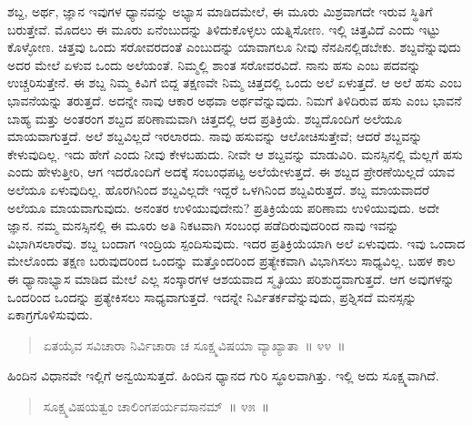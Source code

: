 ಶಬ್ದ, ಅರ್ಥ, ಜ್ಞಾನ ಇವುಗಳ ಧ್ಯಾನವನ್ನು ಅಭ್ಯಾಸ ಮಾಡಿದಮೇಲೆ, ಈ ಮೂರು ಮಿಶ್ರವಾಗದೇ ಇರುವ ಸ್ಥಿತಿಗೆ ಬರುತ್ತೇವೆ. ಮೊದಲು ಈ ಮೂರು ಏನೆಂಬುದನ್ನು ತಿಳಿದುಕೊಳ್ಳಲು ಯತ್ನಿಸೋಣ. ಇಲ್ಲಿ ಚಿತ್ತವಿದೆ ಎಂದು ಇಟ್ಟು ಕೊಳ್ಳೋಣ. ಚಿತ್ತವು ಒಂದು ಸರೋವರದಂತೆ ಎಂಬುದನ್ನು ಯಾವಾಗಲೂ ನೀವು ನೆನಪಿನಲ್ಲಿಡಬೇಕು. ಶಬ್ದವೆನ್ನುವುದು ಅದರ ಮೇಲೆ ಏಳುವ ಒಂದು ಅಲೆಯಂತೆ. ನಿಮ್ಮಲ್ಲಿ ಶಾಂತ ಸರೋವರವಿದೆ. ನಾನು ಹಸು ಎಂಬ ಪದವನ್ನು ಉಚ್ಚರಿಸುತ್ತೇನೆ. ಈ ಶಬ್ದ ನಿಮ್ಮ ಕಿವಿಗೆ ಬಿದ್ದ ತಕ್ಷಣವೇ ನಿಮ್ಮ ಚಿತ್ತದಲ್ಲಿ ಒಂದು ಅಲೆ ಏಳುತ್ತದೆ. ಆ ಅಲೆ ಹಸು ಎಂಬ ಭಾವನೆಯನ್ನು ತರುತ್ತದೆ. ಅದನ್ನೇ ನಾವು ಆಕಾರ ಅಥವಾ ಅರ್ಥವೆನ್ನುವುದು. ನಿಮಗೆ ತಿಳಿದಿರುವ ಹಸು ಎಂಬ ಭಾವನೆ ಬಾಹ್ಯ ಮತ್ತು ಅಂತರಂಗ ಶಬ್ದದ ಪರಿಣಾಮವಾಗಿ ಚಿತ್ತದಲ್ಲಿ ಆದ ಪ್ರತಿಕ್ರಿಯೆ. ಶಬ್ದದೊಂದಿಗೆ ಅಲೆಯೂ ಮಾಯವಾಗುತ್ತದೆ. ಅಲೆ ಶಬ್ದವಿಲ್ಲದೆ ಇರಲಾರದು. ನಾವು ಹಸುವನ್ನು ಆಲೋಚಿಸುತ್ತೇವೆ; ಆದರೆ ಶಬ್ದವನ್ನು ಕೇಳುವುದಿಲ್ಲ. ಇದು ಹೇಗೆ ಎಂದು ನೀವು ಕೇಳಬಹುದು. ನೀವೇ ಆ ಶಬ್ದವನ್ನು ಮಾಡುವಿರಿ. ಮನಸ್ಸಿನಲ್ಲಿ ಮೆಲ್ಲಗೆ ಹಸು ಎಂದು ಹೇಳುತ್ತೀರಿ, ಆಗ ಇದರೊಂದಿಗೆ ಅದಕ್ಕೆ ಸಂಬಂಧಪಟ್ಟ ಅಲೆಯೇಳುತ್ತದೆ. ಈ ಶಬ್ದದ ಪ್ರೇರಣೆಯಿಲ್ಲದೆ ಯಾವ ಅಲೆಯೂ ಏಳುವುದಿಲ್ಲ. ಹೊರಗಿನಿಂದ ಶಬ್ದವಿಲ್ಲದೇ ಇದ್ದರೆ ಒಳಗಿನಿಂದ ಶಬ್ದವಿರುತ್ತದೆ. ಶಬ್ದ ಮಾಯವಾದರೆ ಅಲೆಯೂ ಮಾಯವಾಗುವುದು. ಅನಂತರ ಉಳಿಯುವುದೇನು? ಪ್ರತಿಕ್ರಿಯೆಯ ಪರಿಣಾಮ ಉಳಿಯುವುದು. ಅದೇ ಜ್ಞಾನ. ನಮ್ಮ ಮನಸ್ಸಿನಲ್ಲಿ ಈ ಮೂರು ಅತಿ ನಿಕಟವಾಗಿ ಸಂಬಂಧ ಪಡೆದಿರುವುದರಿಂದ ನಾವು ಇವನ್ನು ವಿಭಾಗಿಸಲಾರೆವು. ಶಬ್ದ ಬಂದಾಗ ಇಂದ್ರಿಯ ಸ್ಪಂದಿಸುವುದು. ಇದರ ಪ್ರತಿಕ್ರಿಯೆಯಾಗಿ ಅಲೆ ಏಳುವುದು. ಇವು ಒಂದಾದ ಮೇಲೊಂದು ತಕ್ಷಣ ಬರುವುದರಿಂದ ಒಂದನ್ನು ಮತ್ತೊಂದರಿಂದ ಪ್ರತ್ಯೇಕವಾಗಿ ವಿಭಾಗಿಸಲು ಸಾಧ್ಯವಿಲ್ಲ. ಬಹಳ ಕಾಲ ಈ ಧ್ಯಾನಾಭ್ಯಾಸ ಮಾಡಿದ ಮೇಲೆ ಎಲ್ಲ ಸಂಸ್ಕಾರಗಳ ಆಶಯವಾದ ಸ್ಮೃತಿಯು ಪರಿಶುದ್ಧವಾಗುತ್ತದೆ. ಆಗ ಅವುಗಳನ್ನು ಒಂದರಿಂದ ಒಂದನ್ನು ಪ್ರತ್ಯೇಕಿಸಲು ಸಾಧ್ಯವಾಗುತ್ತದೆ. ಇದನ್ನೇ ನಿರ್ವಿತರ್ಕವೆನ್ನುವುದು, ಪ್ರಶ್ನಿಸದೆ ಮನಸ್ಸನ್ನು ಏಕಾಗ್ರಗೊಳಿಸುವುದು. 

\vspace{-0.3cm}

\begin{verse}
ಏತಯೈವ ಸವಿಚಾರಾ ನಿರ್ವಿಚಾರಾ ಚ ಸೂಕ್ಷ್ಮವಿಷಯಾ ವ್ಯಾಖ್ಯಾತಾ~॥ ೪೪~॥
\end{verse}

\vspace{-0.4cm}


\vspace{0.1cm}

ಹಿಂದಿನ ವಿಧಾನವೇ ಇಲ್ಲಿಗೆ ಅನ್ವಯಿಸುತ್ತದೆ. ಹಿಂದಿನ ಧ್ಯಾನದ ಗುರಿ ಸ್ಥೂಲವಾಗಿತ್ತು. ಇಲ್ಲಿ ಅದು ಸೂಕ್ಷ್ಮವಾಗಿದೆ. 

\vspace{-0.25cm}

\begin{verse}
ಸೂಕ್ಷ್ಮವಿಷಯತ್ವಂ ಚಾಲಿಂಗಪರ್ಯವಸಾನಮ್​~॥ ೪೫~॥
\end{verse}

\vspace{-0.4cm}

